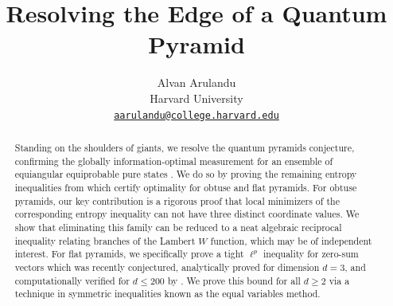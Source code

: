\documentclass[11pt]{article}
\title{Resolving the Edge of a Quantum Pyramid}
\author{Alvan Arulandu\\Harvard University\\\href{mailto:aarulandu@college.harvard.edu}{\texttt{aarulandu@college.harvard.edu}}}
\begin{document}
\maketitle
\begin{abstract}
   Standing on the shoulders of giants, we resolve the quantum pyramids conjecture, confirming the globally information-optimal measurement for an ensemble of equiangular equiprobable pure states \citep{englert2010well}. We do so by proving the remaining entropy inequalities from \citep{holevo2025quantum} which certify optimality for obtuse and flat pyramids.  For obtuse pyramids, our key contribution is a rigorous proof that local minimizers of the corresponding entropy inequality can not have three distinct coordinate values. We show that eliminating this family can be reduced to a neat algebraic reciprocal inequality relating branches of the Lambert $W$ function, which may be of independent interest.
   For flat pyramids, we specifically prove a tight $\ell^p$ inequality for zero-sum vectors which was recently conjectured, analytically proved for dimension $d=3$, and computationally verified for $d\leq 200$ by \citep{holevo2026conjecturetightnorminequality}. We prove this bound for all $d\geq 2$ via a technique in symmetric inequalities known as the equal variables method.
\end{abstract}

\thispagestyle{empty}



\tableofcontents
\setcounter{page}{0}
\thispagestyle{empty}

\newpage
\end{document}
